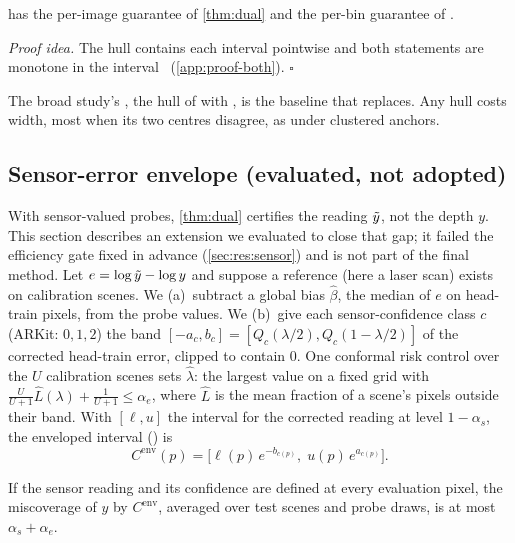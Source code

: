 \begin{theorem}
\label{thm:both}
\mDualBoth has the per-image guarantee of \cref{thm:dual} and the per-bin guarantee of \mDistSplit.
\end{theorem}

\noindent\emph{Proof idea.} The hull contains each interval pointwise and both statements are monotone in the interval~\cite{gasparin2024merging} (\cref{app:proof-both}). \hfill$\square$

\noindent The broad study's \mDistBoth, the hull of \mDistSplit with \mLocalSplit, is the baseline that \mDualBoth replaces.
Any hull costs width, most when its two centres disagree, as under clustered anchors.

\subsection{Sensor-error envelope (evaluated, not adopted)}
\label{sec:env}
With sensor-valued probes, \cref{thm:dual} certifies the reading $\tilde{y}$, not the depth $y$.
This section describes an extension we evaluated to close that gap; it failed the efficiency gate fixed in advance (\cref{sec:res:sensor}) and is not part of the final method.
Let $e=\log\tilde{y}-\log y$ and suppose a reference (here a laser scan) exists on calibration scenes.
We (a)~subtract a global bias $\hat\beta$, the median of $e$ on head-train pixels, from the probe values.
We (b)~give each sensor-confidence class $c$ (ARKit: $0,1,2$) the band $[-a_c,b_c]=[Q_c(\lambda/2),Q_c(1-\lambda/2)]$ of the corrected head-train error, clipped to contain 0.
One conformal risk control over the $U$ calibration scenes sets $\hat\lambda$: the largest value on a fixed grid with $\frac{U}{U+1}\hat L(\lambda)+\frac{1}{U+1}\le\alpha_e$, where $\hat L$ is the mean fraction of a scene's pixels outside their band.
With $[\ell,u]$ the \mDual interval for the corrected reading at level $1-\alpha_s$, the enveloped interval (\mDualEnv) is
\begin{equation}
C^{\text{env}}(p)=\big[\ell(p)\,e^{-b_{c(p)}},\;u(p)\,e^{a_{c(p)}}\big].
\label{eq:envelope}
\end{equation}

\begin{proposition}[Envelope]
\label{prop:env}
If the sensor reading and its confidence are defined at every evaluation pixel, the miscoverage of $y$ by $C^{\text{env}}$, averaged over test scenes and probe draws, is at most $\alpha_s+\alpha_e$.
\end{proposition}

